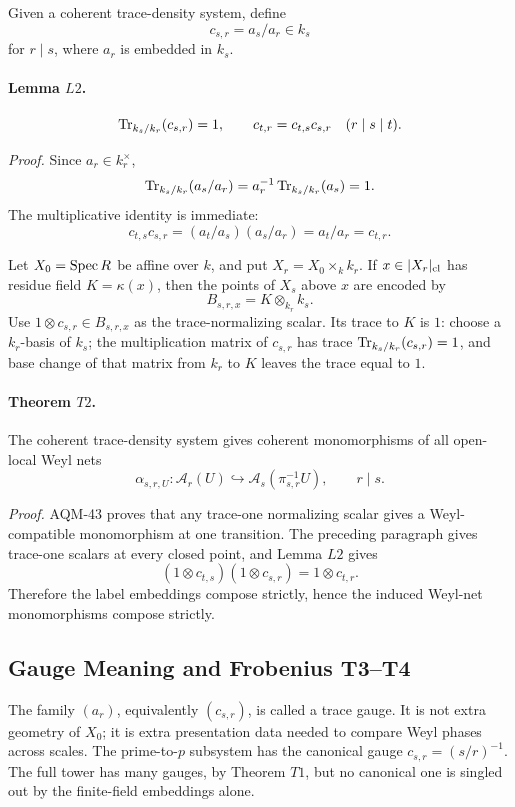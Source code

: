 Given a coherent trace-density system, define
\[
  c_{s,r}=a_s/a_r\in k_s
\]
for \(r\mid s\), where \(a_r\) is embedded in \(k_s\).

\paragraph{Lemma \(L2\).}
\[
  \operatorname{Tr}_{k_s/k_r}(c_{s,r})=1,\qquad
  c_{t,r}=c_{t,s}c_{s,r}\quad(r\mid s\mid t).
\]

\emph{Proof.}
Since \(a_r\in k_r^\times\),
\[
  \operatorname{Tr}_{k_s/k_r}(a_s/a_r)
  =
  a_r^{-1}\operatorname{Tr}_{k_s/k_r}(a_s)=1.
\]
The multiplicative identity is immediate:
\[
  c_{t,s}c_{s,r}=(a_t/a_s)(a_s/a_r)=a_t/a_r=c_{t,r}.
\]

Let \(X_0=\operatorname{Spec} R\) be affine over \(k\), and put
\(X_r=X_0\times_k k_r\).  If \(x\in |X_r|_{\rm cl}\) has residue field
\(K=\kappa(x)\), then the points of \(X_s\) above \(x\) are encoded by
\[
  B_{s,r,x}=K\otimes_{k_r}k_s .
\]
Use \(1\otimes c_{s,r}\in B_{s,r,x}\) as the trace-normalizing scalar.  Its
trace to \(K\) is \(1\): choose a \(k_r\)-basis of \(k_s\); the multiplication
matrix of \(c_{s,r}\) has trace \(\operatorname{Tr}_{k_s/k_r}(c_{s,r})=1\), and base change
of that matrix from \(k_r\) to \(K\) leaves the trace equal to \(1\).

\paragraph{Theorem \(T2\).}
The coherent trace-density system gives coherent monomorphisms of all
open-local Weyl nets
\[
  \alpha_{s,r,U}:\mathcal A_r(U)\hookrightarrow
  \mathcal A_s(\pi_{s,r}^{-1}U),
  \qquad r\mid s.
\]

\emph{Proof.}
AQM-43 proves that any trace-one normalizing scalar gives a Weyl-compatible
monomorphism at one transition.  The preceding paragraph gives trace-one
scalars at every closed point, and Lemma \(L2\) gives
\[
  (1\otimes c_{t,s})(1\otimes c_{s,r})=1\otimes c_{t,r}.
\]
Therefore the label embeddings compose strictly, hence the induced Weyl-net
monomorphisms compose strictly.

\subsection{Gauge Meaning and Frobenius T3--T4}

The family \((a_r)\), equivalently \((c_{s,r})\), is called a trace gauge.  It
is not extra geometry of \(X_0\); it is extra presentation data needed to
compare Weyl phases across scales.  The prime-to-\(p\) subsystem has the
canonical gauge \(c_{s,r}=(s/r)^{-1}\).  The full tower has many gauges, by
Theorem \(T1\), but no canonical one is singled out by the finite-field
embeddings alone.


